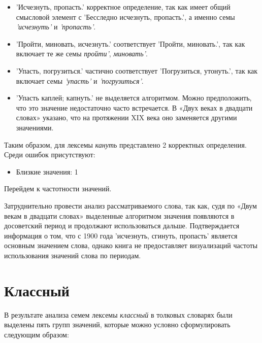 \begin{itemize}
    \item ’Исчезнуть, пропасть.’ корректное определение, так как имеет общий смысловой элемент с
’Бесследно исчезнуть, пропасть.’, а именно семы \textit{’исчезнуть’} и \textit{’пропасть’}.

    \item ’Пройти, миновать, исчезнуть.’ соответствует
’Пройти, миновать.’, так как включает те же семы \textit{пройти’}, \textit{миновать’}.

    \item ’Упасть, погрузиться.’ частично соответствует ’Погрузиться, утонуть.’,
так как включает семы \textit{’упасть’} и \textit{’погрузиться’}.
\end{itemize}

\begin{itemize}
    \item ’Упасть каплей; капнуть.’ не выделяется алгоритмом.
Можно предположить, что это значение недостаточно часто встречается.
В «Двух веках в двадцати словах» указано, что на протяжении XIX века оно заменяется
другими значениями.
\end{itemize}

Таким образом, для лексемы \textit{кануть} представлено 2 корректных определения.
Среди ошибок присутствуют:
\begin{itemize}
    \item Близкие значения: 1
\end{itemize}

Перейдем к частотности значений.

Затруднительно провести анализ рассматриваемого слова,
так как, судя по «Двум векам в двадцати словах» выделенные алгоритмом значения появляются
в досоветский период и продолжают использоваться дальше.
Подтверждается информация о том, что с 1900 года ’исчезнуть, сгинуть, пропасть’ является
основным значением слова, однако книга не предоставляет визуализаций частоты
использования значений слова по периодам.

\section*{Классный}

В результате анализа семем лексемы \textit{классный} в толковых словарях были выделены пять групп значений,
которые можно условно сформулировать следующим образом:

